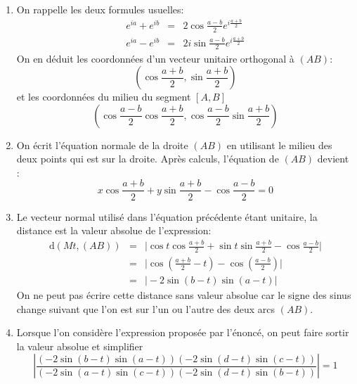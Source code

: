 \begin{enumerate}
\item On rappelle les deux formules usuelles:
\begin{eqnarray*}
e^{ia} + e^{ib}&=& 2\cos \frac{a-b}{2}e^{i\frac{a+b}{2}}\\
e^{ia} - e^{ib}&=& 2i\sin \frac{a-b}{2}e^{i\frac{a+b}{2}}
\end{eqnarray*}
On en déduit les coordonnées d'un vecteur unitaire orthogonal à $(AB)$:
\[(\cos \frac{a+b}{2}, \sin \frac{a+b}{2})\]
et les coordonnées du milieu du segment $[A,B]$ 
\[(\cos \frac{a-b}{2}\cos \frac{a+b}{2}, \cos \frac{a-b}{2} \sin \frac{a+b}{2})\]

\item On écrit l'équation normale de la droite $(AB)$ en utilisant le milieu des deux points qui est sur la droite. Après calculs, l'équation de $(AB)$ devient :
\[x \cos \frac{a+b}{2} + y \sin \frac{a+b}{2} - \cos \frac{a-b}{2}=0\]
\item Le vecteur normal utilisé dans l'équation précédente étant unitaire, la distance est la valeur absolue de l'expression:
\begin{eqnarray*}
\mathrm{d}(Mt,(AB)) &=& \vert \cos t \cos \frac{a+b}{2} + \sin t \sin \frac{a+b}{2} - \cos \frac{a-b}{2}\vert \\
&=& \vert \cos (\frac{a+b}{2}-t) - \cos (\frac{a-b}{2})\vert \\
&=& \vert -2 \sin (b-t) \sin(a-t) \vert
\end{eqnarray*}
On ne peut pas écrire cette distance sans valeur absolue car le signe des sinus change suivant que l'on est sur l'un ou l'autre des deux arcs $(AB)$.
\item Lorsque l'on considère l'expression proposée par l'énoncé, on peut faire sortir la valeur absolue et simplifier
\[\left \vert \frac{( -2 \sin (b-t) \sin(a-t))( -2 \sin (d-t) \sin(c-t))} {( -2 \sin (a-t) \sin(c-t))( -2 \sin (d-t) \sin(b-t))}\right \vert = 1\]
\end{enumerate}